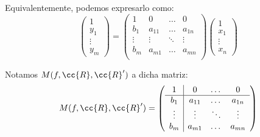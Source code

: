 Equivalentemente, podemos expresarlo como:
\begin{equation*}
    \left(\begin{array}{c}
        1 \\ \hline
        y_1\\ \vdots \\ y_m
    \end{array}\right)
    = \left(\begin{array}{c|ccc}
        1 & 0 & \dots & 0 \\ \hline
        b_{1} & a_{11} & \dots & a_{1n}\\
        \vdots & \vdots & \ddots & \vdots \\
        b_{m} & a_{m1} & \dots & a_{mn}\\
    \end{array}\right)
    \left(\begin{array}{c}
        1\\ \hline
        x_1\\ \vdots \\ x_n
    \end{array}\right)
\end{equation*}

Notamos $M(f,\cc{R},\cc{R}')$ a dicha matriz:
\begin{equation*}
    M(f,\cc{R},\cc{R}') = \left(\begin{array}{c|ccc}
        1 & 0 & \dots & 0 \\ \hline
        b_{1} & a_{11} & \dots & a_{1n}\\
        \vdots & \vdots & \ddots & \vdots \\
        b_{m} & a_{m1} & \dots & a_{mn}\\
    \end{array}\right)
\end{equation*}

